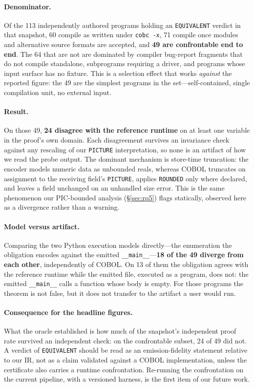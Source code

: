 \documentclass[sigconf,nonacm]{acmart}
\begin{document}
\paragraph{Denominator.} Of the 113 independently authored programs holding an \texttt{EQUIVALENT} verdict in that snapshot, 60 compile as written under \texttt{cobc -x}, 71 compile once modules and alternative source formats are accepted, and \textbf{49 are confrontable end to end}. The 64 that are not are dominated by compiler bug-report fragments that do not compile standalone, subprograms requiring a driver, and programs whose input surface has no fixture. This is a selection effect that works \emph{against} the reported figure: the 49 are the simplest programs in the set---self-contained, single compilation unit, no external input.

\paragraph{Result.} On those 49, \textbf{24 disagree with the reference runtime} on at least one variable in the proof's own domain. Each disagreement survives an invariance check against any rescaling of our \texttt{PICTURE} interpretation, so none is an artifact of how we read the probe output. The dominant mechanism is store-time truncation: the encoder models numeric data as unbounded reals, whereas COBOL truncates on assignment to the receiving field's \texttt{PICTURE}, applies \texttt{ROUNDED} only where declared, and leaves a field unchanged on an unhandled size error. This is the same phenomenon our PIC-bounded analysis (\S\ref{sec:rq5}) flags statically, observed here as a divergence rather than a warning.

\paragraph{Model versus artifact.} Comparing the two Python execution models directly---the enumeration the obligation encodes against the emitted \texttt{\_\_main\_\_}---\textbf{18 of the 49 diverge from each other}, independently of COBOL. On 13 of them the obligation agrees with the reference runtime while the emitted file, executed as a program, does not: the emitted \texttt{\_\_main\_\_} calls a function whose body is empty. For those programs the theorem is not false, but it does not transfer to the artifact a user would run.

\paragraph{Consequence for the headline figures.} What the oracle established is how much of the snapshot's independent proof rate survived an independent check: on the confrontable subset, 24 of 49 did not. A verdict of \texttt{EQUIVALENT} should be read as an emission-fidelity statement relative to our IR, not as a claim validated against a COBOL implementation, unless the certificate also carries a runtime confrontation. Re-running the confrontation on the current pipeline, with a versioned harness, is the first item of our future work.
\end{document}
